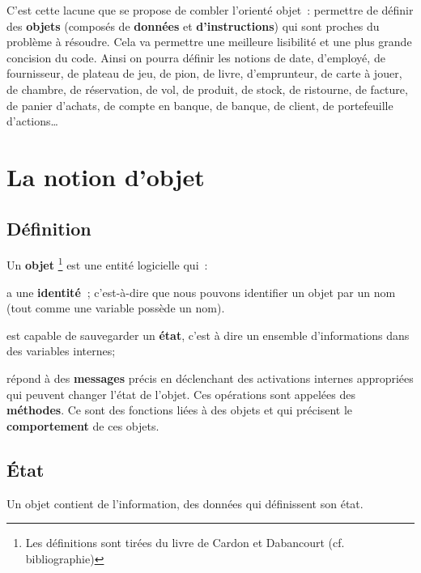 	C'est cette lacune que se propose de combler
	l'orienté objet~: permettre de définir des
	\textbf{objets} (composés de \textbf{données} et
	\textbf{d'instructions}) qui sont proches du problème
	à résoudre. Cela va permettre une meilleure lisibilité et une plus
	grande concision du code. Ainsi on pourra définir les notions de date,
	d'employé, de fournisseur, de plateau de jeu, de pion,
	de livre, d'emprunteur, de carte à jouer, de chambre,
	de réservation, de vol, de produit, de stock, de ristourne, de facture,
	de panier d'achats, de compte en banque, de banque, de
	client, de portefeuille d'actions\dots

\section{La notion d'objet}

	\subsection{Définition}
	
		Un \textbf{objet}%
		\footnote{%
			Les définitions sont tirées du livre de Cardon et
			Dabancourt (cf. bibliographie)
		}
		est une entité logicielle qui~:
	
		\begin{liste}
		\item 
			a une \textbf{identité~}; c'est-à-dire que nous pouvons
			identifier un objet par un nom (tout comme une variable possède un
			nom).
		\item 
			est capable de sauvegarder un \textbf{état}, c'est à
			dire un ensemble d'informations dans des variables
			internes;
		\item 
			répond à des \textbf{messages} précis en déclenchant des activations
			internes appropriées qui peuvent changer l'état de
			l'objet. Ces opérations sont appelées des
			\textbf{méthodes}. Ce sont des fonctions liées à des objets et qui
			précisent le \textbf{comportement} de ces objets.
		\end{liste}

	\subsection{État}

		Un objet contient de l'information, des données qui
		définissent son état.

